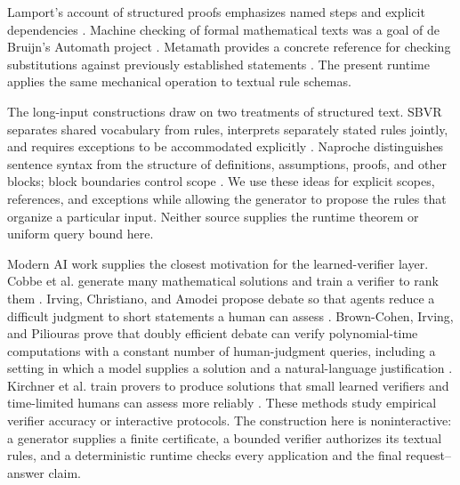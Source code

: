 \documentclass[11pt,twoside]{article}
\theoremstyle{definition}
\begin{document}
Lamport's account of structured proofs emphasizes named steps and explicit
dependencies \cite{lamport}. Machine checking of formal mathematical texts
was a goal of de Bruijn's Automath project \cite{debruijn-automath}. Metamath
provides a concrete reference for checking substitutions against previously
established statements \cite{metamath}. The present runtime applies the same
mechanical operation to textual rule schemas.

The long-input constructions draw on two treatments of structured text.
SBVR separates shared vocabulary from rules, interprets separately stated
rules jointly, and requires exceptions to be accommodated explicitly
\cite[Sections~13, 16.3--16.4]{sbvr}. Naproche distinguishes sentence syntax
from the structure of definitions, assumptions, proofs, and other blocks;
block boundaries control scope \cite[Section~7.2]{cramer}. We use these ideas
for explicit scopes, references, and exceptions while allowing the generator
to propose the rules that organize a particular input. Neither source
supplies the runtime theorem or uniform query bound here.

Modern AI work supplies the closest motivation for the learned-verifier
layer. Cobbe et al. generate many mathematical solutions and train a verifier
to rank them \cite{cobbe-verifiers}. Irving, Christiano, and Amodei propose
debate so that agents reduce a difficult judgment to short statements a human
can assess \cite{irving-debate}. Brown-Cohen, Irving, and Piliouras prove that
doubly efficient debate can verify polynomial-time computations with a
constant number of human-judgment queries, including a setting in which a
model supplies a solution and a natural-language justification
\cite{brown-cohen-debate}. Kirchner et al. train provers to produce solutions
that small learned verifiers and time-limited humans can assess more reliably
\cite{kirchner-legibility}. These methods study empirical verifier accuracy or
interactive protocols. The construction here is noninteractive: a generator
supplies a finite certificate, a bounded verifier authorizes its textual
rules, and a deterministic runtime checks every application and the final
request--answer claim.
\end{document}
